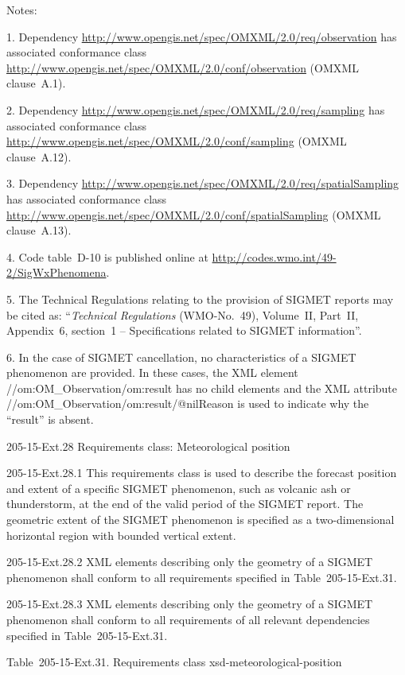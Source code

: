 Notes:

1. Dependency \url{http://www.opengis.net/spec/OMXML/2.0/req/observation} has associated conformance class\\
\url{http://www.opengis.net/spec/OMXML/2.0/conf/observation} (OMXML clause~A.1).

2. Dependency \url{http://www.opengis.net/spec/OMXML/2.0/req/sampling} has associated conformance class\\
\url{http://www.opengis.net/spec/OMXML/2.0/conf/sampling} (OMXML clause~A.12).

3. Dependency \url{http://www.opengis.net/spec/OMXML/2.0/req/spatialSampling} has associated conformance class \url{http://www.opengis.net/spec/OMXML/2.0/conf/spatialSampling} (OMXML clause~A.13).

4. Code table~D-10 is published online at \url{http://codes.wmo.int/49-2/SigWxPhenomena}.

5. The Technical Regulations relating to the provision of SIGMET reports may be cited as: ``\emph{Technical Regulations} (WMO-No.~49), Volume~II, Part~II, Appendix~6, section~1 -- Specifications related to SIGMET information''.

6. In the case of SIGMET cancellation, no characteristics of a SIGMET phenomenon are provided. In these cases, the XML element //om:OM\_Observation/om:result has no child elements and the XML attribute //om:OM\_Observation/om:result/@nilReason is used to indicate why the ``result'' is absent.

205-15-Ext.28 Requirements class: Meteorological position

205-15-Ext.28.1 This requirements class is used to describe the forecast position and extent of a specific SIGMET phenomenon, such as volcanic ash or thunderstorm, at the end of the valid period of the SIGMET report. The geometric extent of the SIGMET phenomenon is specified as a two-dimensional horizontal region with bounded vertical extent.

205-15-Ext.28.2 XML elements describing only the geometry of a SIGMET phenomenon shall conform to all requirements specified in Table~205-15-Ext.31.

205-15-Ext.28.3 XML elements describing only the geometry of a SIGMET phenomenon shall conform to all requirements of all relevant dependencies specified in Table~205-15-Ext.31.

Table~205-15-Ext.31. Requirements class xsd-meteorological-position

